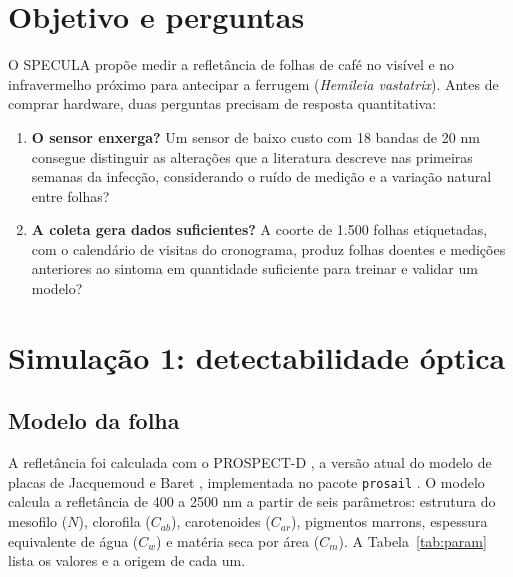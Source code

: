 \documentclass[11pt,a4paper]{article}
\begin{document}
\section{Objetivo e perguntas}
O SPECULA propõe medir a refletância de folhas de café no visível e no infravermelho próximo para antecipar a ferrugem (\emph{Hemileia vastatrix}). Antes de comprar hardware, duas perguntas precisam de resposta quantitativa:
\begin{enumerate}
\item \textbf{O sensor enxerga?} Um sensor de baixo custo com 18 bandas de 20 nm consegue distinguir as alterações que a literatura descreve nas primeiras semanas da infecção, considerando o ruído de medição e a variação natural entre folhas?
\item \textbf{A coleta gera dados suficientes?} A coorte de 1.500 folhas etiquetadas, com o calendário de visitas do cronograma, produz folhas doentes e medições anteriores ao sintoma em quantidade suficiente para treinar e validar um modelo?
\end{enumerate}

\section{Simulação 1: detectabilidade óptica}
\subsection{Modelo da folha}
A refletância foi calculada com o PROSPECT-D \cite{feret2017}, a versão atual do modelo de placas de Jacquemoud e Baret \cite{jacquemoud1990}, implementada no pacote \texttt{prosail} \cite{prosail}. O modelo calcula a refletância de 400 a 2500 nm a partir de seis parâmetros: estrutura do mesofilo ($N$), clorofila ($C_{ab}$), carotenoides ($C_{ar}$), pigmentos marrons, espessura equivalente de água ($C_w$) e matéria seca por área ($C_m$). A Tabela~\ref{tab:param} lista os valores e a origem de cada um.
\end{document}
